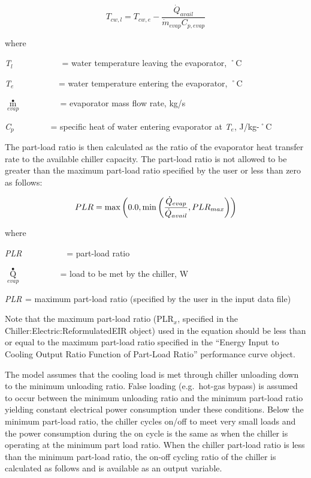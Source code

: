 \begin{equation}
  T_{cw,l}  =  T_{cw,e} - \frac{\dot{Q}_{avail}}{\dot{m}_{evap}C_{p,evap}}
\end{equation}

where

\emph{T\(_{l}\)}~~~~~~~~~~~ = water temperature leaving the evaporator, ˚C

\emph{T\(_{e}\)}~~~~~~~~~~ = water temperature entering the evaporator, ˚C

\({\mathop m\limits^ \bullet_{evap}}\) ~~~~~~~~ = evaporator mass flow rate, kg/s

\emph{C\(_{p}\)}~~~~~~~~ = specific heat of water entering evaporator at \emph{T\(_{e}\)}, J/kg-˚C

The part-load ratio is then calculated as the ratio of the evaporator heat transfer rate to the available chiller capacity. The part-load ratio is not allowed to be greater than the maximum part-load ratio specified by the user or less than zero as follows:

\begin{equation}
  PLR = \max\PB{0.0,\min\PB{\frac{\dot{Q}_{evap}}{\dot{Q}_{avail}},PLR_{max}}}
\end{equation}

where

\emph{PLR}~~~~~~~~~~ = part-load ratio

\({\mathop Q\limits^ \bullet_{evap}}\) ~~~~~~~~ = load to be met by the chiller, W

\emph{PLR\(_{ }\)} = maximum part-load ratio (specified by the user in the input data file)

Note that the maximum part-load ratio (PLR\(_{x}\), specified in the Chiller:Electric:ReformulatedEIR object) used in the equation should be less than or equal to the maximum part-load ratio specified in the ``Energy Input to Cooling Output Ratio Function of Part-Load Ratio'' performance curve object.

The model assumes that the cooling load is met through chiller unloading down to the minimum unloading ratio. False loading (e.g.~hot-gas bypass) is assumed to occur between the minimum unloading ratio and the minimum part-load ratio yielding constant electrical power consumption under these conditions. Below the minimum part-load ratio, the chiller cycles on/off to meet very small loads and the power consumption during the on cycle is the same as when the chiller is operating at the minimum part load ratio. When the chiller part-load ratio is less than the minimum part-load ratio, the on-off cycling ratio of the chiller is calculated as follows and is available as an output variable.

